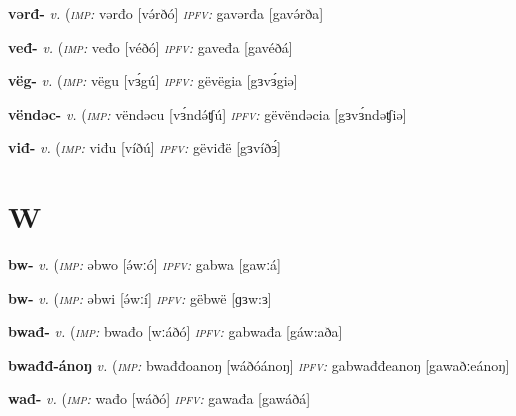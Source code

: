 \newentry
\headword\textbf{vərđ-}  
\ipa{[və́rð-]}
\synpos\textit{v.} 
\imperative(\textit {\textsc{imp:}} vərđo [və́rðó]	
\imperfective\textit{\textsc{ipfv:}} gavərđa [gavə́rða]

\newentry
\headword\textbf{veđ-}  
\ipa{[véð-]}
\synpos\textit{v.} 
\imperative(\textit {\textsc{imp:}} veđo [véðó]	
\imperfective\textit{\textsc{ipfv:}} gaveđa [gavéðá] 

\newentry
\headword\textbf{vëg-}  
\ipa{[vɜ́g-]}
\synpos\textit{v.} 
\imperative(\textit {\textsc{imp:}} vëgu [vɜ́gú]
\imperfective\textit{\textsc{ipfv:}} gëvëgia [gɜvɜ́giə]

\newentry
\headword\textbf{vëndəc-}  
\ipa{[vɜ́ndətʃ-]}
\synpos\textit{v.} 
\imperative(\textit {\textsc{imp:}} vëndəcu [vɜ́ndə́ʧú]
\imperfective\textit{\textsc{ipfv:}} gëvëndəcia [gɜvɜ́ndəʧiə]

\newentry
\headword\textbf{viđ-}  
\ipa{[víð-]}
\synpos\textit{v.} 
\imperative(\textit {\textsc{imp:}} viđu [víðú]	
\imperfective\textit{\textsc{ipfv:}} gëviđë [gɜvíðɜ́] 


\section*{W}\label{W}

\newentry
\headword\textbf{bw-}  
\ipa{[wː-]}
\synpos\textit{v.} 
\imperative(\textit {\textsc{imp:}} əbwo [ə́wːó]
\imperfective\textit{\textsc{ipfv:}} gabwa [gawːá] 

\newentry
\headword\textbf{bw-}  
\ipa{[wː-]}
\synpos\textit{v.} 
\imperative(\textit {\textsc{imp:}} əbwi [ə́wːí]
\imperfective\textit{\textsc{ipfv:}} gëbwë [ɡɜw:ɜ] 

\newentry
\headword\textbf{bwađ-}  
\ipa{[wːað-]}
\synpos\textit{v.} 
\imperative(\textit {\textsc{imp:}} bwađo [wːáðó]
\imperfective\textit{\textsc{ipfv:}} gabwađa [gáw:aða] 

\newentry
\headword\textbf{bwađđ-ánoŋ}  
\synpos\textit{v.} 
\imperative(\textit {\textsc{imp:}} bwađđoanoŋ [wáðóánoŋ]
\imperfective\textit{\textsc{ipfv:}} gabwađđeanoŋ [gawaðːeánoŋ] 

\newentry
\headword\textbf{wađ-}  
\ipa{[wáð-]}
\synpos\textit{v.} 
\imperative(\textit {\textsc{imp:}} wađo [wáðó]
\imperfective\textit{\textsc{ipfv:}} gawađa [gawáðá]

